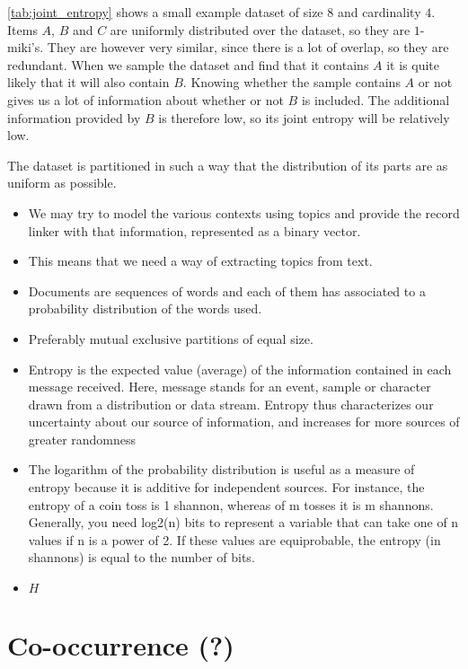 \cref{tab:joint_entropy} shows a small example dataset of size $8$ and cardinality $4$. Items $A$, $B$ and $C$ are uniformly distributed over the dataset, so they are $1$-miki's.
They are however very similar, since there is a lot of overlap, so they are redundant.
When we sample the dataset and find that it contains $A$ it is quite likely that it will also contain $B$.
Knowing whether the sample contains $A$ or not gives us a lot of information about whether or not $B$ is included.
The additional information provided by $B$ is therefore low, so its joint entropy will be relatively low.


The dataset is partitioned in such a way that the distribution of its parts are as uniform as possible.

\begin{itemize}
    \item We may try to model the various contexts using topics and provide the record linker with that information, represented as a binary vector.
    \item This means that we need a way of extracting topics from text.
    \item Documents are sequences of words and each of them has associated to a probability distribution of the words used.
    \item Preferably mutual exclusive partitions of equal size.
    \item Entropy is the expected value (average) of the information contained in each message received. Here, message stands for an event, sample or character drawn from a distribution or data stream. Entropy thus characterizes our uncertainty about our source of information, and increases for more sources of greater randomness
    \item The logarithm of the probability distribution is useful as a measure of entropy because it is additive for independent sources. For instance, the entropy of a coin toss is 1 shannon, whereas of m tosses it is m shannons. Generally, you need log2(n) bits to represent a variable that can take one of n values if n is a power of 2. If these values are equiprobable, the entropy (in shannons) is equal to the number of bits.
    \item $H$
\end{itemize}




\section{Co-occurrence (?)}
\label{sec:co-occurrence}

